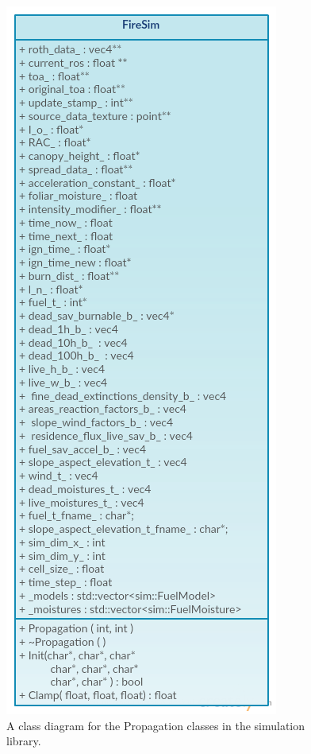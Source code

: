 \begin{figure}
    \centering
    \includegraphics[height=\textheight,keepaspectratio]{figures/design/fire_sim_diagram.png}
    \caption{A class diagram for the Propagation classes in the simulation library.}
    \label{fig:fire_sim_class_diagram}
\end{figure}
